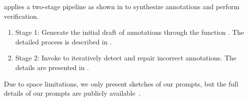 \toolname{} applies a two-stage pipeline as shown in  to synthesize annotations and perform verification.
\begin{enumerate}
\item Stage 1: Generate the initial draft of annotations through the function \genfunc{}. The detailed process is described in .
\item Stage 2: Invoke \fixfunc{} to iteratively detect and repair incorrect annotations. The details are presented in .
\end{enumerate}

\noindent
Due to space limitations, we only present sketches of our prompts, but the full details of our prompts are publicly available~\cite{artifact}.








